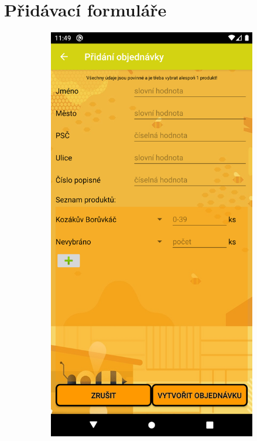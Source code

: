 \documentclass[12pt]{report}
\begin{document}
\section{Přidávací formuláře}
\begin{figure}[H]
	\centering
	\begin{subfigure}{.45\textwidth}
	  \centering
	  \includegraphics[width=\textwidth]{img/order_creation.png}

\end{subfigure}
\end{figure}
\end{document}
